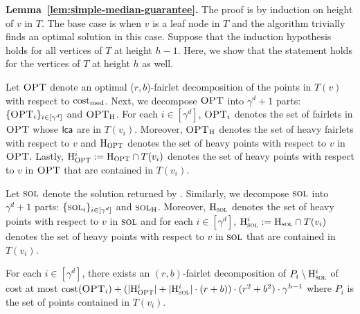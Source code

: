 \iffalse
\begin{proofof}{\bf Lemma~\ref{lem:simple-median-guarantee}.}
The proof is by induction on height of $v$ in $T$. The base case is when $v$ is a leaf node in $T$ and the algorithm trivially finds an optimal solution in this case. Suppose that the induction hypothesis holds for all vertices of $T$ at height $h-1$. Here, we show that the statement holds for the vertices of $T$ at height $h$ as well. 


Let $\textsc{OPT}$ denote an optimal ($r,b$)-fairlet decomposition of the points in $T(v)$ with respect to $\mathrm{cost}_{\mathrm{med}}$. 
Next, we decompose $\textsc{OPT}$ into $\gamma^d + 1$ parts: $\{\textsc{OPT}_i\}_{i\in [\gamma^d]}$ and $\textsc{OPT}_{\mathrm{H}}$. 
For each $i\in[\gamma^d]$, $\textsc{OPT}_i$ denotes the set of fairlets in $\textsc{OPT}$ whose $\textsf{lca}$ are in $T(v_i)$. Moreover, $\textsc{OPT}_{\mathrm{H}}$ denotes the set of heavy fairlets with respect to $v$ and $\mathrm{H}_{\textsc{OPT}}$ denotes the set of heavy points with respect to $v$ in $\textsc{OPT}$. Lastly, $\mathrm{H}^i_{\textsc{OPT}} := \mathrm{H}_{\textsc{OPT}} \cap T(v_i)$ denotes the set of heavy points with respect to $v$ in $\textsc{OPT}$ that are contained in $T(v_i)$. 
 
Let $\textsc{sol}$ denote the solution returned by . Similarly, we decompose $\textsc{sol}$ into $\gamma^d+1$ parts:  $\{\textsc{sol}_i\}_{i\in [\gamma^d]}$ and $\textsc{sol}_{\mathrm{H}}$. Moreover, $\mathrm{H}_{\textsc{sol}}$ denotes the set of heavy points with respect to $v$ in $\textsc{sol}$ and for each $i\in [\gamma^d]$, $\mathrm{H}^i_{\textsc{sol}} := \mathrm{H}_{\textsc{sol}} \cap T(v_i)$ denotes the set of heavy points with respect to $v$ in $\textsc{sol}$ that are contained in $T(v_i)$.

\begin{claim}\label{clm:aug-cost}
For each $i\in [\gamma^d]$, there exists an $(r,b)$-fairlet decomposition of $P_i\setminus \mathrm{H}_{\textsc{sol}}^i$ of cost at most $\mathrm{cost}(\textsc{OPT}_i) + (|\mathrm{H}^i _{\textsc{OPT}}| + |\mathrm{H}^i_{\textsc{sol}}| \cdot (r+b)) \cdot (r^2 + b^2) \cdot \gamma^{h-1}$ where $P_i$ is the set of points contained in $T(v_i)$.%
\end{claim}


\end{proofof}
